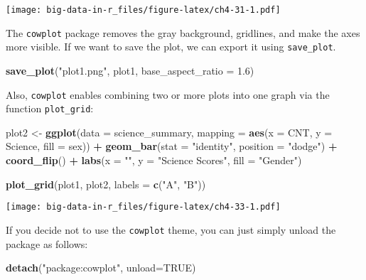 \documentclass[]{book}
\newenvironment{Shaded}{\begin{snugshade}}{\end{snugshade}}
\newcommand{\DataTypeTok}[1]{\textcolor[rgb]{0.13,0.29,0.53}{#1}}
\newcommand{\FloatTok}[1]{\textcolor[rgb]{0.00,0.00,0.81}{#1}}
\newcommand{\KeywordTok}[1]{\textcolor[rgb]{0.13,0.29,0.53}{\textbf{#1}}}
\newcommand{\NormalTok}[1]{#1}
\newcommand{\OperatorTok}[1]{\textcolor[rgb]{0.81,0.36,0.00}{\textbf{#1}}}
\newcommand{\OtherTok}[1]{\textcolor[rgb]{0.56,0.35,0.01}{#1}}
\newcommand{\StringTok}[1]{\textcolor[rgb]{0.31,0.60,0.02}{#1}}
\begin{document}
\texttt{[image: big-data-in-r\_files/figure-latex/ch4-31-1.pdf]}

The \texttt{cowplot} package removes the gray background, gridlines, and make the axes more visible. If we want to save the plot, we can export it using \texttt{save\_plot}.

\begin{Shaded}
\begin{Highlighting}[]
\KeywordTok{save_plot}\NormalTok{(}\StringTok{"plot1.png"}\NormalTok{, plot1,}
          \DataTypeTok{base_aspect_ratio =} \FloatTok{1.6}\NormalTok{)}
\end{Highlighting}
\end{Shaded}

Also, \texttt{cowplot} enables combining two or more plots into one graph via the function \texttt{plot\_grid}:

\begin{Shaded}
\begin{Highlighting}[]
\NormalTok{plot2 <-}\StringTok{ }
\StringTok{  }\KeywordTok{ggplot}\NormalTok{(}\DataTypeTok{data =}\NormalTok{ science_summary,}
         \DataTypeTok{mapping =} \KeywordTok{aes}\NormalTok{(}\DataTypeTok{x =}\NormalTok{ CNT, }\DataTypeTok{y =}\NormalTok{ Science, }\DataTypeTok{fill =}\NormalTok{ sex)) }\OperatorTok{+}
\StringTok{  }\KeywordTok{geom_bar}\NormalTok{(}\DataTypeTok{stat =} \StringTok{"identity"}\NormalTok{, }\DataTypeTok{position =} \StringTok{"dodge"}\NormalTok{) }\OperatorTok{+}
\StringTok{  }\KeywordTok{coord_flip}\NormalTok{() }\OperatorTok{+}
\StringTok{  }\KeywordTok{labs}\NormalTok{(}\DataTypeTok{x =} \StringTok{""}\NormalTok{, }\DataTypeTok{y =} \StringTok{"Science Scores"}\NormalTok{, }\DataTypeTok{fill =} \StringTok{"Gender"}\NormalTok{) }


\KeywordTok{plot_grid}\NormalTok{(plot1, plot2, }\DataTypeTok{labels =} \KeywordTok{c}\NormalTok{(}\StringTok{"A"}\NormalTok{, }\StringTok{"B"}\NormalTok{))}
\end{Highlighting}
\end{Shaded}

\texttt{[image: big-data-in-r\_files/figure-latex/ch4-33-1.pdf]}

If you decide not to use the \texttt{cowplot} theme, you can just simply unload the package as follows:

\begin{Shaded}
\begin{Highlighting}[]
\KeywordTok{detach}\NormalTok{(}\StringTok{"package:cowplot"}\NormalTok{, }\DataTypeTok{unload=}\OtherTok{TRUE}\NormalTok{)}
\end{Highlighting}
\end{Shaded}
\end{document}
